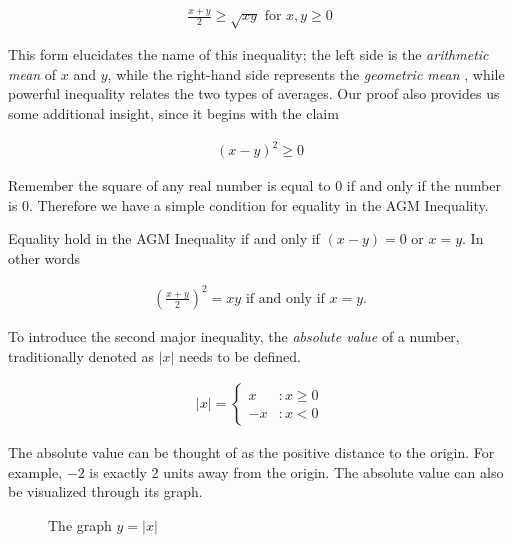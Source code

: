 \documentclass[twoside]{report}
\begin{document}
\begin{align}
	\frac{x + y}{2} \ge \sqrt{xy} \text{ for } x, y \ge 0
\end{align}

This form elucidates the name of this inequality; the left side is the \emph{arithmetic mean} of $x$ and $y$, while the right-hand side represents the \emph{geometric mean} , while powerful inequality relates the two types of averages. Our proof also provides us some additional insight, since it begins with the claim

\begin{align*}
	(x - y)^2 \ge 0
\end{align*}

Remember the square of any real number is equal to 0 if and only if the number is 0. Therefore we have a simple condition for equality in the AGM Inequality.

\vspace{\baselineskip}
\begin{theorem}
	Equality hold in the AGM Inequality if and only if $(x - y) = 0$ or $x = y$. In other words
	
	\begin{align}
		\left( \frac{x + y}{2} \right)^2 = xy \text{ if and only if } x = y.
	\end{align}
\end{theorem}

To introduce the second major inequality, the \emph{absolute value}  of a number, traditionally denoted as $|x|$ needs to be defined.

\begin{align*}
	|x| = \begin{cases}
		x &: x \ge 0 \\
		-x &: x < 0
	\end{cases}
\end{align*}

The absolute value can be thought of as the positive distance to the origin. For example, $-2$ is exactly 2 units away from the origin. The absolute value can also be visualized through its graph.

\begin{figure}
	\begin{center}
	\end{center}
	\caption{The graph $y = |x|$}
\end{figure}
\end{document}
